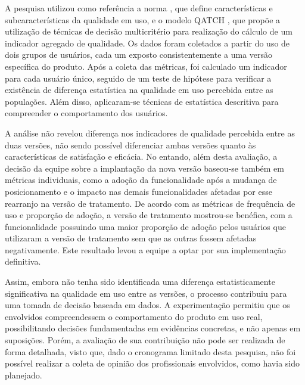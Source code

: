 A pesquisa utilizou como referência a norma , que define características e subcaracterísticas da qualidade em uso, e o modelo QATCH \cite{qatch}, que propõe a utilização de técnicas de decisão multicritério para realização do cálculo de um indicador agregado de qualidade. Os dados foram coletados a partir do uso de dois grupos de usuários, cada um exposto consistentemente a uma versão específica do produto. Após a coleta das métricas, foi calculado um indicador para cada usuário único, seguido de um teste de hipótese para verificar a existência de diferença estatística na qualidade em uso percebida entre as populações. Além disso, aplicaram-se técnicas de estatística descritiva para compreender o comportamento dos usuários.

A análise não revelou diferença nos indicadores de qualidade percebida entre as duas versões, não sendo possível diferenciar ambas versões quanto às características de satisfação e eficácia. No entando, além desta avaliação, a decisão da equipe sobre a implantação da nova versão baseou-se também em métricas individuais, como a adoção da funcionalidade após a mudança de posicionamento e o impacto nas demais funcionalidades afetadas por esse rearranjo na versão de tratamento. De acordo com as métricas de frequência de uso e proporção de adoção, a versão de tratamento mostrou-se benéfica, com a funcionalidade possuindo uma maior proporção de adoção pelos usuários que utilizaram a versão de tratamento sem que as outras fossem afetadas negativamente. Este resultado levou a equipe a optar por sua implementação definitiva.

Assim, embora não tenha sido identificada uma diferença estatisticamente significativa na qualidade em uso entre as versões, o processo contribuiu para uma tomada de decisão baseada em dados. A experimentação permitiu que os envolvidos compreendessem o comportamento do produto em uso real, possibilitando decisões fundamentadas em evidências concretas, e não apenas em suposições. Porém, a avaliação de sua contribuição não pode ser realizada de forma detalhada, visto que, dado o cronograma limitado desta pesquisa, não foi possível realizar a coleta de opinião dos profissionais envolvidos, como havia sido planejado.
